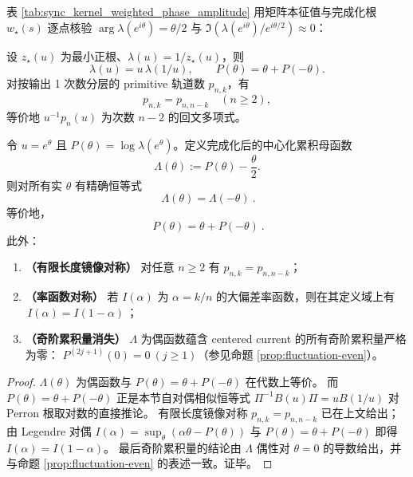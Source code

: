 \begin{remark}\label{rem:sync-kernel-weighted-phase-amplitude-table}
表 \ref{tab:sync_kernel_weighted_phase_amplitude} 用矩阵本征值与完成化根 \(w_\star(s)\) 逐点核验
\(\arg\lambda(e^{i\theta})=\theta/2\) 与 \(\Im(\lambda(e^{i\theta})/e^{i\theta/2})\approx 0\)：

\end{remark}
设 $z_\star(u)$ 为最小正根、$\lambda(u)=1/z_\star(u)$，则
\[
\lambda(u)=u\,\lambda(1/u),
\qquad
P(\theta)=\theta+P(-\theta).
\]
对按输出 1 次数分层的 primitive 轨道数 $p_{n,k}$，有
\[
p_{n,k}=p_{n,n-k}\quad(n\ge 2),
\]
等价地 $u^{-1}p_n(u)$ 为次数 $n-2$ 的回文多项式。

\begin{theorem}\label{thm:sync-kernel-gallavotti-cohen}
令 \(u=e^{\theta}\) 且 \(P(\theta)=\log\lambda(e^\theta)\)。定义完成化后的中心化累积母函数
\[
\Lambda(\theta):=P(\theta)-\frac{\theta}{2}.
\]
则对所有实 \(\theta\) 有精确恒等式
\[
\boxed{\ \Lambda(\theta)=\Lambda(-\theta)\ }.
\]
等价地，
\[
\boxed{\ P(\theta)=\theta+P(-\theta)\ }.
\]
此外：
\begin{enumerate}
  \item \textbf{（有限长度镜像对称）} 对任意 \(n\ge 2\) 有 \(p_{n,k}=p_{n,n-k}\)；
  \item \textbf{（率函数对称）} 若 \(I(\alpha)\) 为 \(\alpha=k/n\) 的大偏差率函数，则在其定义域上有
  \(\boxed{\,I(\alpha)=I(1-\alpha)\,}\)；
  \item \textbf{（奇阶累积量消失）} \(\Lambda\) 为偶函数蕴含 centered current 的所有奇阶累积量严格为零：
  \(P^{(2j+1)}(0)=0\ (j\ge 1)\)（参见命题 \ref{prop:fluctuation-even}）。
\end{enumerate}
\end{theorem}
\begin{proof}
\(\Lambda(\theta)\) 为偶函数与 \(P(\theta)=\theta+P(-\theta)\) 在代数上等价。
而 \(P(\theta)=\theta+P(-\theta)\) 正是本节自对偶相似恒等式 \(\Pi^{-1}B(u)\Pi=uB(1/u)\) 对 Perron 根取对数的直接推论。
有限长度镜像对称 \(p_{n,k}=p_{n,n-k}\) 已在上文给出；由 Legendre 对偶 \(I(\alpha)=\sup_{\theta}(\alpha\theta-P(\theta))\) 与 \(P(\theta)=\theta+P(-\theta)\) 即得 \(I(\alpha)=I(1-\alpha)\)。
最后奇阶累积量的结论由 \(\Lambda\) 偶性对 \(\theta=0\) 的导数给出，并与命题 \ref{prop:fluctuation-even} 的表述一致。证毕。
\end{proof}

